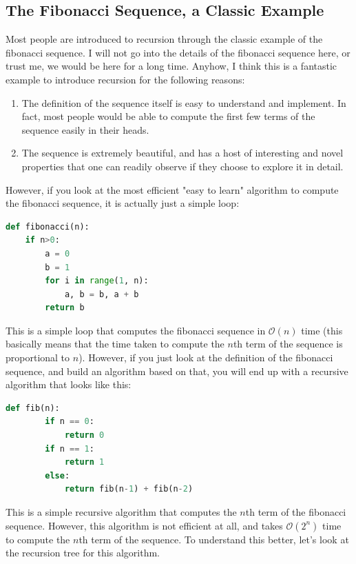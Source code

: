 \documentclass[openany]{book}
\begin{document}
\subsection{The Fibonacci Sequence, a Classic Example}
Most people are introduced to recursion through the classic example of the fibonacci sequence. I will not go into the details of the fibonacci sequence here, or trust me, we would be here for a long time. Anyhow, I think this is a fantastic example to introduce recursion for the following reasons: \\
\begin{enumerate}
    \item The definition of the sequence itself is easy to understand and implement. In fact, most people would be able to compute the first few terms of the sequence easily in their heads. 
    \item The sequence is extremely beautiful, and has a host of interesting and novel properties that one can readily observe if they choose to explore it in detail. 
\end{enumerate}
However, if you look at the most efficient "easy to learn" algorithm to compute the fibonacci sequence, it is actually just a simple loop: 
\begin{lstlisting}[language=Python]
def fibonacci(n):
    if n>0:
        a = 0 
        b = 1
        for i in range(1, n):
            a, b = b, a + b
        return b
\end{lstlisting}
This is a simple loop that computes the fibonacci sequence in \(\mathcal{O}(n)\) time (this basically means that the time taken to compute the \(n\)th term of the sequence is proportional to \(n\)). However, if you just look at the definition of the fibonacci sequence, and build an algorithm based on that, you will end up with a recursive algorithm that looks like this:
\begin{lstlisting}[language=Python]
    def fib(n):
        if n == 0:
            return 0 
        if n == 1:
            return 1
        else:
            return fib(n-1) + fib(n-2)
\end{lstlisting}
This is a simple recursive algorithm that computes the \(n\)th term of the fibonacci sequence. However, this algorithm is not efficient at all, and takes \(\mathcal{O}(2^n)\) time to compute the \(n\)th term of the sequence. To understand this better, let's look at the recursion tree for this algorithm. \\
\end{document}

